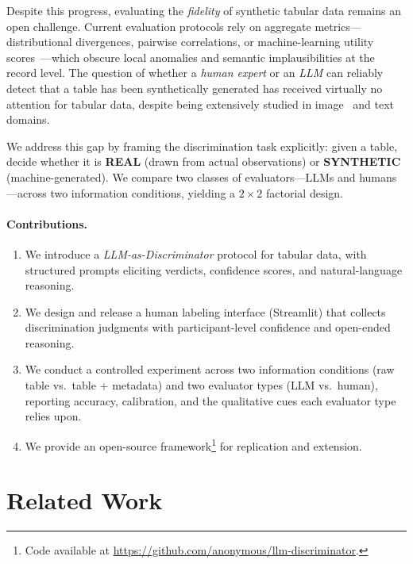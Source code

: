 \documentclass[runningheads]{llncs}
\begin{document}
Despite this progress, evaluating the \emph{fidelity} of synthetic
tabular data remains an open challenge.
Current evaluation protocols rely on aggregate metrics---distributional
divergences, pairwise correlations, or machine-learning utility
scores~\cite{platzer2021holdout}---which obscure local anomalies and
semantic implausibilities at the record level.
The question of whether a \emph{human expert} or an \emph{LLM} can
reliably detect that a table has been synthetically generated has
received virtually no attention for tabular data, despite being
extensively studied in image~\cite{rossler2019faceforensics} and
text~\cite{ippolito2020automatic} domains.

We address this gap by framing the discrimination task explicitly:
given a table, decide whether it is \textbf{REAL} (drawn from actual
observations) or \textbf{SYNTHETIC} (machine-generated).
We compare two classes of evaluators---LLMs and humans---across two
information conditions, yielding a $2 \times 2$ factorial design.

\paragraph{Contributions.}
\begin{enumerate}[leftmargin=*,label=(\roman*)]
  \item We introduce a \emph{LLM-as-Discriminator} protocol for tabular
        data, with structured prompts eliciting verdicts, confidence
        scores, and natural-language reasoning.
  \item We design and release a human labeling interface (Streamlit)
        that collects discrimination judgments with participant-level
        confidence and open-ended reasoning.
  \item We conduct a controlled experiment across two information
        conditions (raw table vs.\ table + metadata) and two evaluator
        types (LLM vs.\ human), reporting accuracy, calibration, and
        the qualitative cues each evaluator type relies upon.
  \item We provide an open-source framework\footnote{Code available at
        \url{https://github.com/anonymous/llm-discriminator}.}
        for replication and extension.
\end{enumerate}

\section{Related Work}
\label{sec:related}
\end{document}
